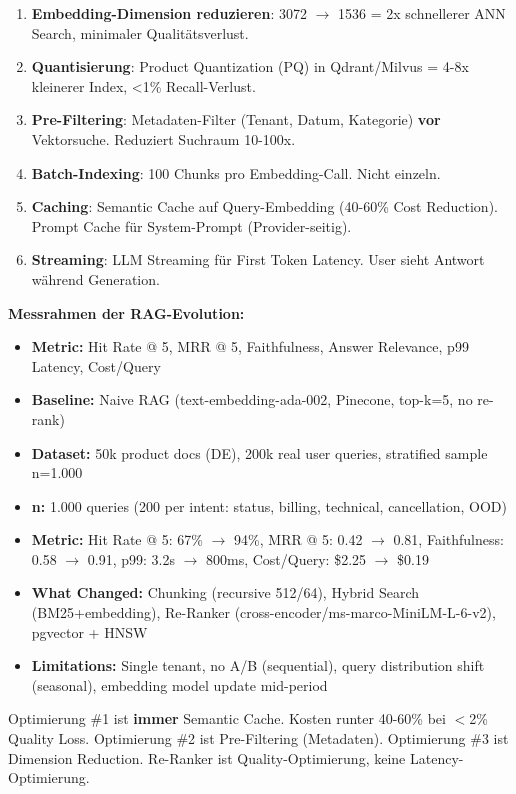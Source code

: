 \begin{enumerate}[leftmargin=*]
    \item \textbf{Embedding-Dimension reduzieren}: 3072 $\to$ 1536 = 2x schnellerer ANN Search, minimaler Qualitätsverlust.
    \item \textbf{Quantisierung}: Product Quantization (PQ) in Qdrant/Milvus = 4-8x kleinerer Index, <1\% Recall-Verlust.
    \item \textbf{Pre-Filtering}: Metadaten-Filter (Tenant, Datum, Kategorie) \textbf{vor} Vektorsuche. Reduziert Suchraum 10-100x.
    \item \textbf{Batch-Indexing}: 100 Chunks pro Embedding-Call. Nicht einzeln.
    \item \textbf{Caching}: Semantic Cache auf Query-Embedding (40-60\% Cost Reduction). Prompt Cache für System-Prompt (Provider-seitig).
    \item \textbf{Streaming}: LLM Streaming für First Token Latency. User sieht Antwort während Generation.
\end{enumerate}

\medskip
\textbf{Messrahmen der RAG-Evolution:}
\begin{itemize}[leftmargin=*]
  \item \textbf{Metric:} Hit Rate @ 5, MRR @ 5, Faithfulness, Answer Relevance, p99 Latency, Cost/Query
  \item \textbf{Baseline:} Naive RAG (text-embedding-ada-002, Pinecone, top-k=5, no re-rank)
  \item \textbf{Dataset:} 50k product docs (DE), 200k real user queries, stratified sample n=1.000
  \item \textbf{n:} 1.000 queries (200 per intent: status, billing, technical, cancellation, OOD)
  \item \textbf{Metric:} Hit Rate @ 5: 67\% $\to$ 94\%, MRR @ 5: 0.42 $\to$ 0.81, Faithfulness: 0.58 $\to$ 0.91, p99: 3.2s $\to$ 800ms, Cost/Query: \$2.25 $\to$ \$0.19
  \item \textbf{What Changed:} Chunking (recursive 512/64), Hybrid Search (BM25+embedding), Re-Ranker (cross-encoder/ms-marco-MiniLM-L-6-v2), pgvector + HNSW
  \item \textbf{Limitations:} Single tenant, no A/B (sequential), query distribution shift (seasonal), embedding model update mid-period
\end{itemize}

\par\mbox{}\par
\begin{praxishinweisEnv}
Optimierung \#1 ist \textbf{immer} Semantic Cache. Kosten runter 40-60\% bei $<$2\% Quality Loss.
Optimierung \#2 ist Pre-Filtering (Metadaten).
Optimierung \#3 ist Dimension Reduction.
Re-Ranker ist Quality-Optimierung, keine Latency-Optimierung.
\end{praxishinweisEnv}

